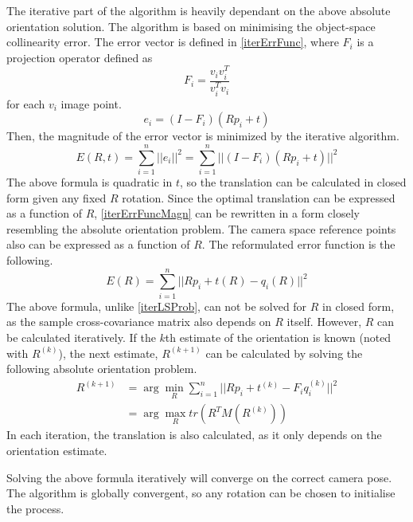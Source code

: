 The iterative part of the algorithm is heavily dependant on the above absolute orientation solution.
The algorithm is based on minimising the object-space collinearity error.
The error vector is defined in \eqref{iterErrFunc}, where $F_i$ is a projection operator defined as
\begin{equation}
	F_i = \frac{v_iv_i^T}{v_i^Tv_i}
\end{equation}
for each $v_i$ image point.
\begin{equation}
	e_i = (I - F_i)(Rp_i + t)
	\label{eq:iterErrFunc}
\end{equation}
Then, the magnitude of the error vector is minimized by the iterative algorithm.
\begin{equation}
	E(R,t) = \sum_{i=1}^{n} ||e_i||^2 = \sum_{i=1}^{n} ||(I - F_i)(Rp_i + t)||^2 
	\label{eq:iterErrFuncMagn}
\end{equation}
The above formula is quadratic in $t$, so the translation can be calculated in closed form given any fixed $R$ rotation.
Since the optimal translation can be expressed as a function of $R$, \eqref{iterErrFuncMagn} can be rewritten in a form closely resembling the absolute orientation problem.
The camera space reference points also can be expressed as a function of $R$.
The reformulated error function is the following.
\begin{equation}
	E(R) = \sum_{i=1}^{n} || Rp_i + t(R) - q_i(R) ||^2
\end{equation}
The above formula, unlike \eqref{iterLSProb}, can not be solved for $R$ in closed form, as the sample cross-covariance matrix also depends on $R$ itself.
However, $R$ can be calculated iteratively.
If the $k$th estimate of the orientation is known (noted with $R^{(k)}$), the next estimate, $R^{(k+1)}$ can be calculated by solving the following absolute orientation problem.
\begin{align}
	R^{(k+1)} &= \arg \min_R \sum_{i=1}^{n} || Rp_i + t^{(k)} - F_iq_i^{(k)} ||^2 \\
			  &= \arg \max_R tr(R^TM(R^{(k)})) 
\end{align}
In each iteration, the translation is also calculated, as it only depends on the orientation estimate.

Solving the above formula iteratively will converge on the correct camera pose\cite{iterative}.
The algorithm is globally convergent, so any rotation can be chosen to initialise the process.

